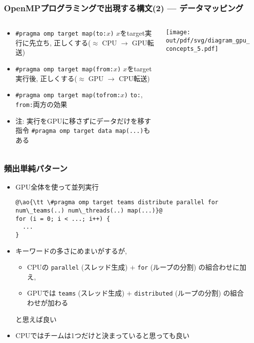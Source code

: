 \documentclass[10pt,dvipdfmx]{beamer}
\newcommand{\ao}[1]{{\color{blue}#1}}
\begin{document}
\begin{frame}
  \frametitle{OpenMPプログラミングで出現する構文(2) --- データマッピング}
  \begin{columns}
    \begin{column}{0.45\textwidth}
      \begin{itemize}
      \item \ao{\tt \#pragma omp target map(to:$ x$)}
        $x$をtarget実行に先立ち, 正しくする($\approx$ CPU $\rightarrow$ GPU転送)
      \item \ao{\tt \#pragma omp target map(from:$ x$)}
        $x$をtarget実行後, 正しくする($\approx$ GPU $\rightarrow$ CPU転送)
      \item \ao{\tt \#pragma omp target map(tofrom:$ x$)}
        {\tt to:}, {\tt from:}両方の効果
      \item 注: 実行をGPUに移さずにデータだけを移す指令
        \ao{\tt \#pragma omp target data map(...)}もある
      \end{itemize}
    \end{column}
    \begin{column}{0.6\textwidth}
      \texttt{[image: out/pdf/svg/diagram\_gpu\_concepts\_5.pdf]}
    \end{column}
  \end{columns}
\end{frame}

\begin{frame}[fragile]
  \frametitle{頻出単純パターン}
  \begin{itemize}
  \item GPU全体を使って並列実行
    \begin{lstlisting}
@\ao{\tt \#pragma omp target teams distribute parallel for num\_teams(..) num\_threads(..) map(...)}@
for (i = 0; i < ...; i++) {
  ...
}  
\end{lstlisting}
\item キーワードの多さにめまいがするが,
  \begin{itemize}
  \item CPUの {\tt parallel} (スレッド生成) $+$ {\tt for} (ループの分割)
    の組合わせに加え, 
  \item GPUでは {\tt teams} (スレッド生成) $+$ {\tt distributed} (ループの分割)
    の組合わせが加わる
  \end{itemize}
  と思えば良い
\item CPUではチームは1つだけと決まっていると思っても良い
\end{itemize}
\end{frame}
\end{document}
